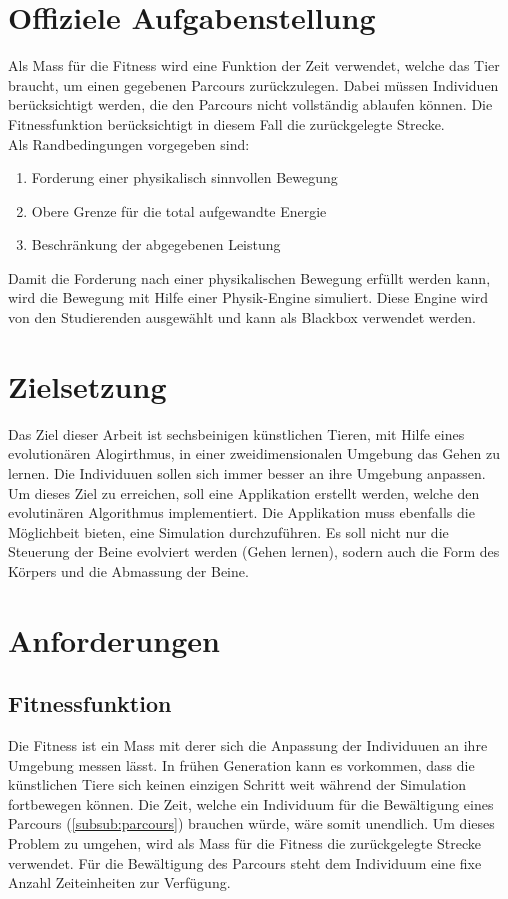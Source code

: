   \section{Offiziele Aufgabenstellung}
    Als Mass für die Fitness wird eine Funktion der Zeit verwendet, welche das Tier braucht,
    um einen gegebenen Parcours zurückzulegen.
    Dabei müssen Individuen berücksichtigt werden, die den Parcours nicht vollständig ablaufen können.
    Die Fitnessfunktion berücksichtigt in diesem Fall die zurückgelegte Strecke.
    \\
    Als Randbedingungen vorgegeben sind:
    \begin{enumerate}
      \item Forderung einer physikalisch sinnvollen Bewegung
      \item Obere Grenze für die total aufgewandte Energie
      \item Beschränkung der abgegebenen Leistung
    \end{enumerate}
    Damit die Forderung nach einer physikalischen Bewegung erfüllt werden kann,
    wird die Bewegung mit Hilfe einer Physik-Engine simuliert.
    Diese Engine wird von den Studierenden ausgewählt und kann als Blackbox verwendet werden.

\section{Zielsetzung}
  Das Ziel dieser Arbeit ist sechsbeinigen künstlichen Tieren, mit Hilfe eines evolutionären Alogirthmus, in einer zweidimensionalen Umgebung das Gehen zu lernen.
  Die Individuuen sollen sich immer besser an ihre Umgebung anpassen.
  Um dieses Ziel zu erreichen, soll eine Applikation erstellt werden, welche den evolutinären Algorithmus implementiert.
  Die Applikation muss ebenfalls die Möglichbeit bieten, eine Simulation durchzuführen.
  Es soll nicht nur die Steuerung der Beine evolviert werden (Gehen lernen), sodern auch die Form des Körpers und die Abmassung der Beine.

  \section{Anforderungen}

    \subsection{Fitnessfunktion}
      Die Fitness ist ein Mass mit derer sich die Anpassung der Individuuen an ihre Umgebung messen lässt.
      In frühen Generation kann es vorkommen, dass die künstlichen Tiere sich keinen einzigen Schritt weit während der Simulation
      fortbewegen können. Die Zeit, welche ein Individuum für die Bewältigung eines Parcours (\vref{subsub:parcours}) brauchen würde, wäre somit unendlich.
      Um dieses Problem zu umgehen, wird als Mass für die Fitness die zurückgelegte Strecke verwendet.
      Für die Bewältigung des Parcours steht dem Individuum eine fixe Anzahl Zeiteinheiten zur Verfügung.

